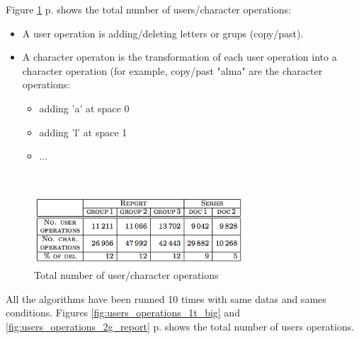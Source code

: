 Figure \ref{fig:operations} p.\pageref{fig:operations} shows the total number of users/character operations:
\begin{itemize}
	\item A user operation is adding/deleting letters or grups (copy/past).
	\item A character operaton is the transformation of each user operation into a character operation (for example, copy/past "alma" are the character operations: \begin{itemize}
					\item adding 'a' at space 0
					\item adding 'l' at space 1
					\item ...
				\end{itemize}
\end{itemize}~

\begin{figure}[h]
  \center
  \includegraphics[width=0.7\textwidth]{includes/operations.png}
  \caption{Total number of user/character operations}
  \label{fig:operations}
\end{figure}

All the algorithms have been runned 10 times with same datas and sames conditions. Figures \ref{fig:users_operations_1t_big} and \ref{fig:users_operations_2g_report} p.\pageref{fig:users_operations_2g_report} shows the total number of users operations.


